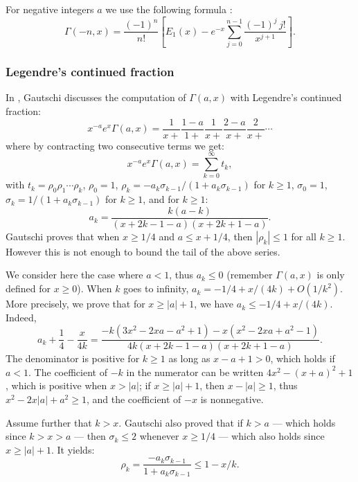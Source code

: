 \documentclass[12pt]{amsart}
\begin{document}
For negative integers $a$ we use the following formula
\cite[formula 6.5.19]{AbSt73}:
\[ \Gamma(-n,x) = \frac{(-1)^n}{n!} [E_1(x) - e^{-x}
   \sum_{j=0}^{n-1} \frac{(-1)^j \, j!}{x^{j+1}}]. \]

\subsubsection{Legendre's continued fraction}


In \cite{Gautschi79}, Gautschi discusses the computation of $\Gamma(a,x)$
with Legendre's continued fraction:
\[ x^{-a} e^x \Gamma(a,x) = \frac{1}{x+} \frac{1-a}{1+} \frac{1}{x+}
   \frac{2-a}{x+} \frac{2}{x+} \cdots \]
where by contracting two consecutive terms we get:
\begin{equation} \label{eq:legendre_cf}
x^{-a} e^x \Gamma(a,x) = \sum_{k=0}^{\infty} t_k,
\end{equation}
with $t_k = \rho_0 \rho_1 \cdots \rho_k$,
$\rho_0 = 1$, $\rho_k = -a_k \sigma_{k-1} / (1 + a_k \sigma_{k-1})$
for $k \geq 1$, $\sigma_0 = 1$,
$\sigma_k = 1 / (1 + a_k \sigma_{k-1})$ for $k \geq 1$, and for $k \geq 1$:
\[ a_k = \frac{k (a-k)}{(x + 2k - 1 - a) (x + 2k + 1 - a)}. \]
Gautschi proves that when  $x \geq 1/4$ and $a \leq x + 1/4$, then
$|\rho_k| \leq 1$ for all $k \geq 1$. However this is not enough to bound
the tail of the above series.

We consider here the case where $a < 1$, thus $a_k \leq 0$
(remember $\Gamma(a,x)$ is only defined for $x \geq 0$).
When $k$ goes to infinity, $a_k = -1/4 + x/(4k) + O(1/k^2)$.
More precisely, we prove that for $x \geq |a| + 1$, we have
$a_k \leq -1/4 + x/(4k)$. Indeed,
\[ a_k + \frac{1}{4} - \frac{x}{4k} = 
   \frac{-k(3x^2-2xa-a^2+1)-x(x^2-2xa+a^2-1)}{4k(x+2k-1-a)(x + 2 k + 1 - a)}. \]
The denominator is positive for $k \geq 1$ as long as $x-a+1 > 0$,
which holds if $a < 1$.
The coefficient of $-k$ in the numerator can be written
$4x^2-(x+a)^2+1$, which is positive when $x > |a|$;
if $x \geq |a| + 1$, then $x - |a| \geq 1$, thus
$x^2 - 2 x |a| + a^2 \geq 1$, and the coefficient of $-x$ is nonnegative.

Assume further that $k > x$.
Gautschi also proved that if $k > a$ --- which holds since
$k > x > a$ --- then $\sigma_k \leq 2$ whenever $x \geq 1/4$ ---
which also holds since $x \geq |a| + 1$.
It yields:
\[ \rho_k = \frac{-a_k \sigma_{k-1}}{1 + a_k \sigma_{k-1}} \leq 1 - x/k. \]
\end{document}
